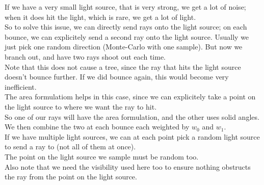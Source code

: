 \documentclass[12pt]{article}
\begin{document}
If we have a very small light source, that is very
strong, we get a lot of noise; when it does
hit the light, which is rare, we get a lot of light. \\

So to solve this issue, we can directly send rays
onto the light source; on each bounce,
we can explicitely send a second ray onto
the light source. Usually we just pick one
random direction (Monte-Carlo with one sample).
But now we branch out, and have two rays
shoot out each time. \\

Note that this does not cause a tree,
since the ray that hits the light source
doesn't bounce further.
If we did bounce again, this would
become very inefficient. \\

The area formulatiom helps in this case,
since we can explicitely take a point on the
light source to where we want the ray
to hit. \\

So one of our rays will have the area formulation,
and the other uses solid angles.
We then combine the two at each bounce
each weighted by $w_0$ and $w_1$. \\

If we have multiple light sources,
we can at each point pick a random light
source to send a ray to (not all of them
at once). \\

The point on the light source we sample
must be random too. \\
Also note that we need the visibility used
here too to ensure nothing obstructs the
ray from the point on the light source. \\
\end{document}
